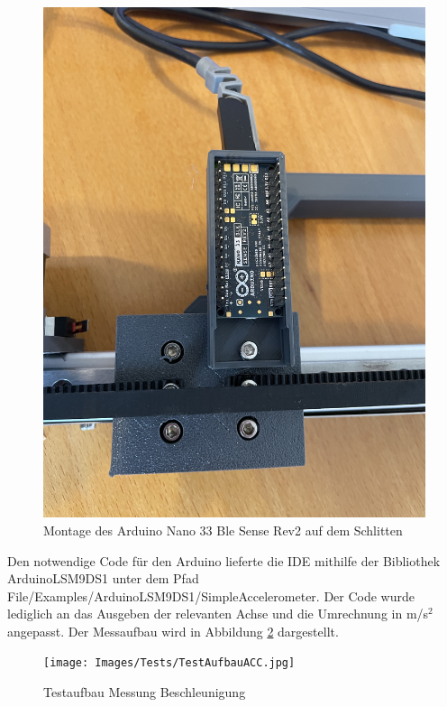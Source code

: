 \begin{figure}[H]
	\begin{center}
		\includegraphics[width=\textwidth]{Images/Tests/ArdRev2Schlitten.jpg}
		\caption{Montage des Arduino Nano 33 Ble Sense Rev2 auf dem Schlitten} \label{ArdRev2Schlitten}
	\end{center}
\end{figure} 

Den notwendige Code für den Arduino lieferte die IDE mithilfe der Bibliothek ArduinoLSM9DS1 unter dem Pfad File/Examples/ArduinoLSM9DS1/SimpleAccelerometer. Der Code wurde lediglich an das Ausgeben der relevanten Achse und die Umrechnung in m/s$^2$ angepasst. Der Messaufbau wird in Abbildung \ref{TestAuffbauACC} dargestellt. 

\begin{figure}[H]
	\begin{center}
		\texttt{[image: Images/Tests/TestAufbauACC.jpg]}
		\caption{Testaufbau Messung Beschleunigung} \label{TestAuffbauACC}
	\end{center}
	\end{figure} 


